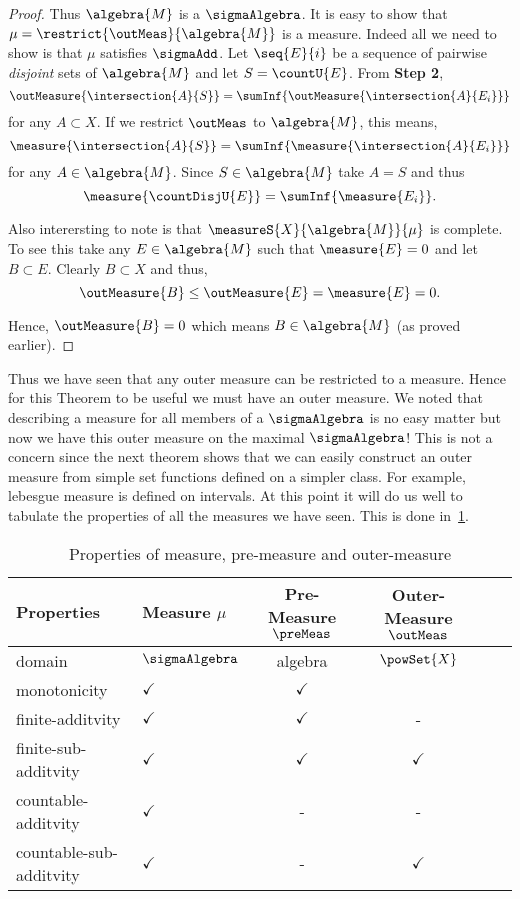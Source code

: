 \begin{proof}
    Thus $\algebra{M}$ is a $\sigmaAlgebra$. It is easy to show that
    $\mu = \restrict{\outMeas}{\algebra{M}}$ is a measure. Indeed all we need to show is that $\mu$
    satisfies $\sigmaAdd$. 
    Let $\seq{E}{i}$ be a sequence of pairwise \emph{disjoint} sets of $\algebra{M}$ and let
    $S = \countU{E}$.
    From \textbf{\large{Step 2}}, 
    \[\outMeasure{\intersection{A}{S}} = \sumInf{\outMeasure{\intersection{A}{E_i}}}\] for any
    $A\subset X$. If we restrict $\outMeas$ to $\algebra{M}$, this means,
     \[\measure{\intersection{A}{S}} = \sumInf{\measure{\intersection{A}{E_i}}}\] for any
    $A\in\algebra{M}$. Since $S \in \algebra{M}$ take $A = S$ and thus
    \[\measure{\countDisjU{E}} = \sumInf{\measure{E_i}}.\]

    Also interersting to note is that $\measureS{X}{\algebra{M}}{\mu}$ is complete. To see this take
    any $E \in \algebra{M}$ such that $\measure{E} = 0$ and let $B \subset E$. Clearly $B \subset X$
    and thus, \[\outMeasure{B} \leq \outMeasure{E} = \measure{E} = 0.\]

    Hence, $\outMeasure{B} = 0$ which means $B \in \algebra{M}$ (as proved earlier).
\end{proof}
Thus we have seen that any outer measure can be restricted to a measure. Hence for this Theorem to be
useful we must have an outer measure. We noted that describing a measure for all members of a
$\sigmaAlgebra$ is no easy matter but now we have this outer measure on the maximal $\sigmaAlgebra$!
This is not a concern since the next theorem shows that we can easily construct an outer measure
from simple set functions defined on a simpler class. For example, lebesgue measure is defined on
intervals. At this point it will do us well to tabulate the properties of all the measures we
have seen. This is done in~\ref{tab:prop_measures}. 

\begin{table}
    \caption{Properties of measure, pre-measure and outer-measure}\label{tab:prop_measures}
    \begin{tabular}{llcccr}
	\toprule
	Properties  & Measure $\mu$ & Pre-Measure $\preMeas$ & Outer-Measure $\outMeas$ \\
	\midrule
	domain & $\sigmaAlgebra$ & algebra & $\powSet{X}$\\
	monotonicity & $\checkmark$ & $\checkmark$ & \checkmark\\
	finite-additvity & $\checkmark$ & $\checkmark$ & -\\
	finite-sub-additvity & $\checkmark$ & $\checkmark$ &$\checkmark$ \\
	countable-additvity & $\checkmark$ &-&-\\
	countable-sub-additvity & $\checkmark$ &-&$\checkmark$\\
	\bottomrule
    \end{tabular}
\end{table}

